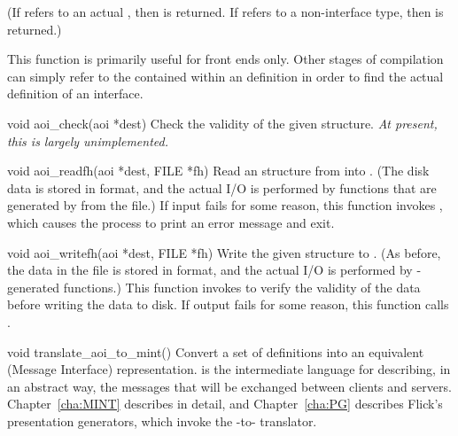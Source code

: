 \begin{cprototypelist}
  (If  refers to an actual , then
   is returned.  If  refers to a
  non-interface type, then  is returned.)

  This function is primarily useful for front ends only.  Other stages of
  compilation can simply refer to the  contained within an
   definition in order to find the actual definition of an
  interface.


  \item[void aoi_check(aoi *dest)]
  Check the validity of the given  structure.  \emph{At present,
  this is largely unimplemented.}

  \item[void aoi_readfh(aoi *dest, FILE *fh)]
  Read an  structure from  into .
  (The disk data is stored in \XDR{} format, and the actual I/O is performed by
  functions that are generated by \rpcgen{} from the 
  file.)  If input fails for some reason, this function invokes
  , which causes the process to print an error message and
  exit.

  \item[void aoi_writefh(aoi *dest, FILE *fh)]
  Write the given  structure to .  (As before, the
  data in the file is stored in \XDR{} format, and the actual I/O is performed
  by \rpcgen{}-generated functions.)  This function invokes
   to verify the validity of the \AOI{} data before
  writing the data to disk.  If output fails for some reason, this function
  calls .


  \item[void translate_aoi_to_mint()]
  Convert a set of \AOI{} definitions into an equivalent \MINT{} (Message
  Interface) representation.  \MINT{} is the intermediate language for
  describing, in an abstract way, the messages that will be exchanged between
  clients and servers.  Chapter~\ref{cha:MINT} describes \MINT{} in detail, and
  Chapter~\ref{cha:PG} describes Flick's presentation generators, which invoke
  the \AOI{}-to-\MINT{} translator.
\end{cprototypelist}

